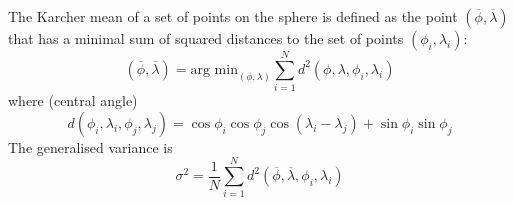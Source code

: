 \documentclass{article}
\begin{document}
The Karcher mean of a set of points on the sphere
\citep{Karcher1977,HeoSmall2006} is defined as the point
$(\overline{\phi}, \overline{\lambda})$ that has a minimal sum of
squared distances to the set of points $(\phi_i, \lambda_i)$:
\begin{equation}
  \label{fold-sphere:eq:6}
  (\overline{\phi}, \overline{\lambda}) = \mbox{arg min}_{(\phi,
    \lambda)} \sum_{i=1}^N d^2(\phi, \lambda, \phi_i, \lambda_i)
\end{equation}
where (central angle)
\begin{equation}
  \label{fold-sphere:eq:7}
  d(\phi_i, \lambda_i, \phi_j, \lambda_j) = \cos\phi_i\cos\phi_j\cos(\lambda_i-\lambda_j) + \sin\phi_i\sin\phi_j  
\end{equation}
The generalised variance is
\begin{equation}
  \label{fold-sphere:eq:8}
  \sigma^2 = \frac{1}{N} \sum_{i=1}^N d^2(\overline{\phi}, \overline{\lambda}, \phi_i, \lambda_i)
\end{equation}



\end{document}

